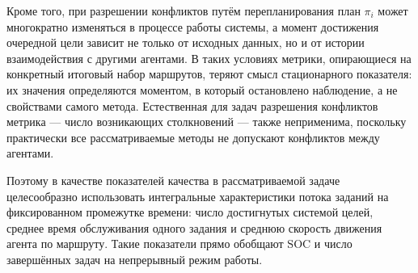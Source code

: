 Кроме того, при разрешении конфликтов путём перепланирования план
$\pi_i$ может многократно изменяться в процессе работы системы, а момент достижения очередной цели
зависит не только от исходных данных, но и от истории взаимодействия с другими агентами. В таких
условиях метрики, опирающиеся на конкретный итоговый набор маршрутов, теряют смысл стационарного
показателя: их значения определяются моментом, в который остановлено наблюдение, а не свойствами
самого метода. Естественная для задач разрешения конфликтов метрика --- число возникающих
столкновений --- также неприменима, поскольку практически все рассматриваемые методы 
не допускают конфликтов между агентами.

Поэтому в качестве показателей качества в рассматриваемой задаче целесообразно использовать
интегральные характеристики потока заданий на фиксированном промежутке времени: число
достигнутых системой целей, среднее время обслуживания одного задания и среднюю скорость
движения агента по маршруту. Такие показатели прямо обобщают $\mathrm{SOC}$ и число завершённых
задач на непрерывный режим работы.
